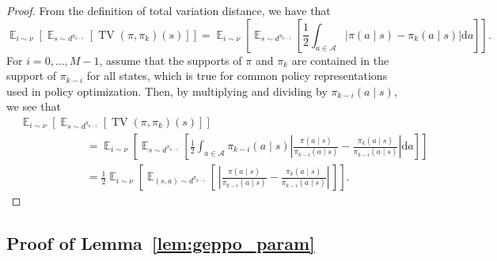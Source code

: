 \documentclass{article}
\begin{document}
\begin{proof}
From the definition of total variation distance, we have that
\begin{equation}
\mathop{\mathbb{E}}_{i \sim \nu} \left[ \mathop{\mathbb{E}}_{s \sim d^{\pi_{k-i}}} \left[ \operatorname{TV}(\pi,\pi_{k})(s) \right] \right] = \mathop{\mathbb{E}}_{i \sim \nu} \left[ \mathop{\mathbb{E}}_{s \sim d^{\pi_{k-i}}} \left[ \frac{1}{2} \int_{a \in \mathcal{A}} \left| \pi(a \mid s) - \pi_k(a \mid s)  \right| \mathrm{d}a \right] \right].
\end{equation}
For $i=0,\ldots,M-1$, assume that the supports of $\pi$ and $\pi_k$ are contained in the support of $\pi_{k-i}$ for all states, which is true for common policy representations used in policy optimization. Then, by multiplying and dividing by $\pi_{k-i}(a \mid s)$, we see that
\begin{equation}
\begin{split}
&\mathop{\mathbb{E}}_{i \sim \nu} \left[ \mathop{\mathbb{E}}_{s \sim d^{\pi_{k-i}}} \left[ \operatorname{TV}(\pi,\pi_{k})(s) \right] \right] \\
& \qquad \qquad \qquad =  \mathop{\mathbb{E}}_{i \sim \nu} \left[ \mathop{\mathbb{E}}_{s \sim d^{\pi_{k-i}}} \left[ \frac{1}{2} \int_{a \in \mathcal{A}} \pi_{k-i}(a \mid s) \left| \frac{\pi(a \mid s)}{\pi_{k-i}(a \mid s)} - \frac{\pi_k(a \mid s)}{\pi_{k-i}(a \mid s)}  \right| \mathrm{d}a \right] \right] \\
& \qquad \qquad \qquad = \frac{1}{2} \mathop{\mathbb{E}}_{i \sim \nu} \left[ \mathop{\mathbb{E}}_{(s,a) \sim d^{\pi_{k-i}}} \left[ \, \left| \frac{\pi(a \mid s)}{\pi_{k-i}(a \mid s)} - \frac{\pi_k(a \mid s)}{\pi_{k-i}(a \mid s)}  \right| \, \right] \right].
\end{split}
\end{equation}

\end{proof}

\subsection{Proof of Lemma~\ref{lem:geppo_param}}
\end{document}
